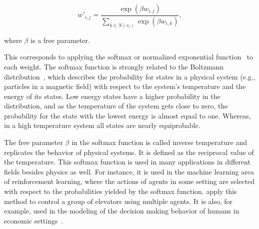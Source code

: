 \begin{equation}
    w'_{i,j} = \frac{\exp(\beta w_{i,j})}{\sum_{k \in N(v_{i})} \exp(\beta w_{i,k})},
\end{equation}

where \( \beta \) is a free parameter.

This corresponds to applying the softmax or normalized exponential function~\cite{Bishop2006} to each weight.
The softmax function is strongly related to the Boltzmann distribution~\cite{vanLaarhoven1987}, which describes the probability for states in a physical system (e.g., particles in a magnetic field) with respect to the system's temperature and the energy of its states.
Low energy states have a higher probability in the distribution, and as the temperature of the system gets close to zero, the probability for the state with the lowest energy is almost equal to one.
Whereas, in a high temperature system all states are nearly equiprobable.

The free parameter \( \beta \) in the softmax function is called inverse temperature and replicates the behavior of physical systems.
It is defined as the reciprocal value of the temperature.
This softmax function is used in many applications in different fields besides physics as well.
For instance, it is used in the machine learning area of reinforcement learning, where the actions of agents in some setting are selected with respect to the probabilities yielded by the softmax function.
\citet{Crites1998} apply this method to control a group of elevators using multiple agents.
It is also, for example, used in the modeling of the decision making behavior of humans in economic settings~\cite{Ray2008}.


